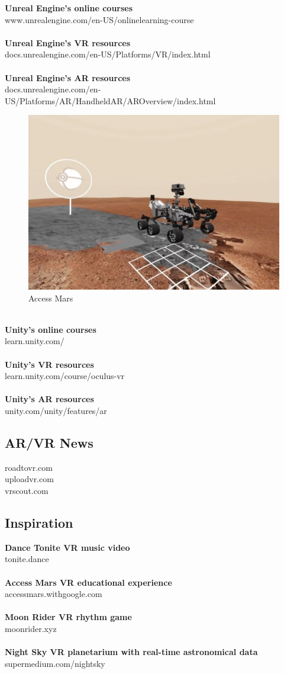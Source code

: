 \documentclass{article}
\begin{document}
\textbf{Unreal Engine's online courses}\\
www.unrealengine.com/en-US/onlinelearning-course\\
\\
\textbf{Unreal Engine's VR resources}\\
docs.unrealengine.com/en-US/Platforms/VR/index.html\\
\\
\textbf{Unreal Engine's AR resources}\\
docs.unrealengine.com/en-US/Platforms/AR/HandheldAR/AROverview/index.html
\\
\begin{figure}
\centering
\includegraphics[width=.55\textwidth]{mars}
\caption{Access Mars}
\end{figure}
\\
\textbf{Unity's online courses}\\
learn.unity.com/\\
\\
\textbf{Unity's VR resources}\\
learn.unity.com/course/oculus-vr\\
\\
\textbf{Unity's AR resources}\\
unity.com/unity/features/ar

\subsection{AR/VR News}
roadtovr.com\\
uploadvr.com\\
vrscout.com\\

\subsection{Inspiration}

\textbf{Dance Tonite VR music video}\\
tonite.dance\\
\\
\textbf{Access Mars VR educational experience}\\
accessmars.withgoogle.com\\
\\
\textbf{Moon Rider VR rhythm game}\\
moonrider.xyz\\
\\
\textbf{Night Sky VR planetarium with real-time astronomical data}\\
supermedium.com/nightsky
\end{document}
